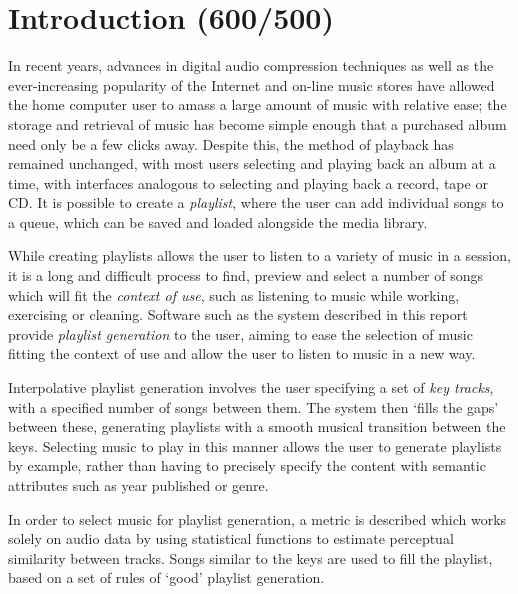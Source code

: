 \chapter{Introduction (600/500)}
\begin{comment}
	\item rationale
	\item purpose
	\item issues
	\item context
	\item relevance
	\item structure of dissertation
\end{comment}
In recent years, advances in digital audio compression techniques as well as the ever-increasing popularity of the Internet and on-line music stores have allowed the home computer user to amass a large amount of music with relative ease; the storage and retrieval of music has become simple enough that a purchased album need only be a few clicks away. Despite this, the method of playback has remained unchanged, with most users selecting and playing back an album at a time, with interfaces analogous to selecting and playing back a record, tape or CD. It is possible to create a \emph{playlist}, where the user can add individual songs to a queue, which can be saved and loaded alongside the media library.

While creating playlists allows the user to listen to a variety of music in a session, it is a long and difficult process to find, preview and select a number of songs which will fit the \emph{context of use}, such as listening to music while working, exercising or cleaning. Software such as the system described in this report provide \emph{playlist generation} to the user, aiming to ease the selection of music fitting the context of use and allow the user to listen to music in a new way.

Interpolative playlist generation involves the user specifying a set of \emph{key tracks}, with a specified number of songs between them. The system then `fills the gaps' between these, generating playlists with a smooth musical transition between the keys. Selecting music to play in this manner allows the user to generate playlists by example, rather than having to precisely specify the content with semantic attributes such as year published or genre.

In order to select music for playlist generation, a metric is described which works solely on audio data by using statistical functions to estimate perceptual similarity between tracks. Songs similar to the keys are used to fill the playlist, based on a set of rules of `good' playlist generation.

